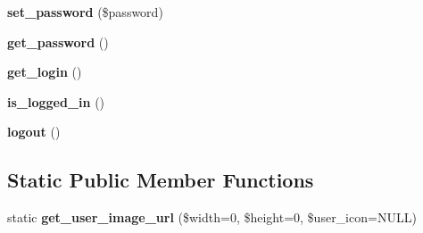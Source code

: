 \begin{DoxyCompactItemize}
\item 
\hypertarget{classlms__user_a58233c54f363eb1caf94164d8965ff97}{
{\bfseries set\_\-password} (\$password)}
\label{classlms__user_a58233c54f363eb1caf94164d8965ff97}

\item 
\hypertarget{classlms__user_a45aec8299729f417a0f4f3269ed11dbf}{
{\bfseries get\_\-password} ()}
\label{classlms__user_a45aec8299729f417a0f4f3269ed11dbf}

\item 
\hypertarget{classlms__user_a352a8757981eebd00811d9a2afa6b97c}{
{\bfseries get\_\-login} ()}
\label{classlms__user_a352a8757981eebd00811d9a2afa6b97c}

\item 
\hypertarget{classlms__user_af06cc5512125394ba36519e76ce014e7}{
{\bfseries is\_\-logged\_\-in} ()}
\label{classlms__user_af06cc5512125394ba36519e76ce014e7}

\item 
\hypertarget{classlms__user_a7ea1eb51a13e3203325fdb243a1215fb}{
{\bfseries logout} ()}
\label{classlms__user_a7ea1eb51a13e3203325fdb243a1215fb}

\end{DoxyCompactItemize}
\subsection*{Static Public Member Functions}
\begin{DoxyCompactItemize}
\item 
\hypertarget{classlms__user_a6a3ca986c1de176e0ca35bde2478418a}{
static {\bfseries get\_\-user\_\-image\_\-url} (\$width=0, \$height=0, \$user\_\-icon=NULL)}
\label{classlms__user_a6a3ca986c1de176e0ca35bde2478418a}

\end{DoxyCompactItemize}
